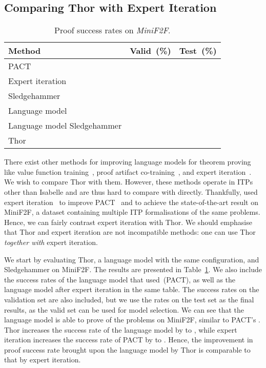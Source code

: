 \documentclass{article}
\begin{document}
\subsection{Comparing Thor with Expert Iteration}
\begin{table}[t]
    \begin{minipage}{\linewidth}
      \centering
        \caption{Proof success rates on \emph{MiniF2F}.}
        \label{tab: mini rate}
        \centering
        \begin{tabular}{lcc}
            \toprule
            Method   & Valid~(\%) & Test~(\%)\\ 
            \midrule
            PACT~\citep{han2021proof} &  & \\
            Expert iteration~\citep{polu2022formal} &  &  \\
            \midrule
            Sledgehammer &  & \\
            Language model &  &  \\
            Language model  Sledgehammer &  &  \\
            \midrule
            Thor &  &  \\
            \bottomrule
        \end{tabular}
    \end{minipage}\end{table}

There exist other methods for improving language models for theorem proving like value function training~\citep{polu2020generative}, proof artifact co-training~\citep[PACT]{han2021proof}, and expert iteration~\citep{polu2022formal}. We wish to compare Thor with them. However, these methods operate in ITPs other than Isabelle and are thus hard to compare with directly. Thankfully, \citet{polu2022formal} used expert iteration~\citep{silver2017mastering} to improve PACT~\citep{han2021proof} and to achieve the state-of-the-art result on MiniF2F, a dataset containing multiple ITP formalisations of the same problems. Hence, we can fairly contrast expert iteration with Thor. We should emphasise that Thor and expert iteration are not incompatible methods: one can use Thor \emph{together with} expert iteration.

We start by evaluating Thor, a language model with the same configuration, and Sledgehammer on MiniF2F. The results are presented in Table~\ref{tab: mini rate}. We also include the success rates of the language model that \citet{polu2022formal} used~(PACT), as well as the language model after expert iteration in the same table. The success rates on the validation set are also included, but we use the rates on the test set as the final results, as the valid set can be used for model selection. We can see that the language model is able to prove  of the problems on MiniF2F, similar to PACT's . Thor increases the success rate of the language model by  to , while expert iteration increases the success rate of PACT by  to . Hence, the improvement in proof success rate brought upon the language model by Thor is comparable to that by expert iteration. 
\end{document}
